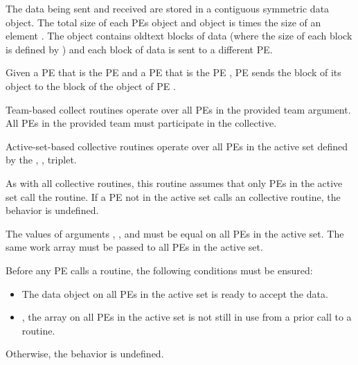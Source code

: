 \begin{apidefinition}
{    The data being sent and received are
    stored in a contiguous symmetric data object. The total size of each \acp{PE}
     object and  object is  times the size of
    an element 
    .
    The  object contains oldtext{}  blocks of data
    (where the size of each block is defined by ) and each block of data
    is sent to a different \ac{PE}.


    Given a \ac{PE}  that is the \kth \ac{PE} 
     and a \ac{PE}
     that is the \lth \ac{PE} 
    ,
    \ac{PE}  sends the \lth block of its  object to
    the \kth block of
    the  object of \ac{PE} .

{\color{Green}
    Team-based collect routines operate over all \acp{PE} in the provided team
    argument. All \acp{PE} in the provided team must participate in the collective.

    Active-set-based collective routines operate over all \acp{PE} in the active set
    defined by the , ,  triplet.
}
    As with all \oldtext{\openshmem}  collective routines,
    this routine assumes that only \acp{PE} in the active set call the routine.
    If a \ac{PE} not in the active set calls an  \oldtext{\openshmem}
     collective routine,
    the behavior is undefined.

    The values of arguments  , ,
    and  must be equal on all \acp{PE} in the active set. The same
      work
    array must be passed to all \acp{PE} in the active set.

    Before any \ac{PE} calls a  routine,
    the following conditions must be ensured:
    \begin{itemize}
    \item The  data object on all \acp{PE} in the active set is
      ready to accept the  data.
    \item {}, the  array
    on all \acp{PE} in the active set is not still in use from a prior call
    to a  routine.
    \end{itemize}
    Otherwise, the behavior is undefined.

}
\end{apidefinition}
